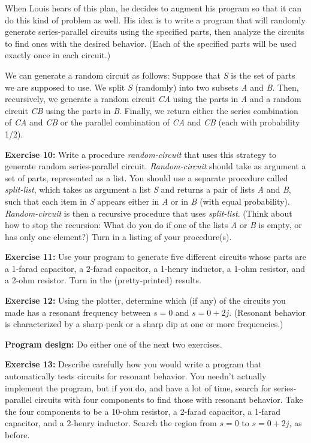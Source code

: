 When Louis hears of this plan, he decides to augment his program so
that it can do this kind of problem as well.  His idea is to write a
program that will randomly generate series-parallel circuits using the
specified parts, then analyze the circuits to find ones with the desired
behavior.  (Each of the specified parts will be used exactly once in
each circuit.)

We can generate a random circuit as follows: Suppose that {\it S} is the
set of parts we are supposed to use.  We split {\it S} (randomly) into
two subsets {\it A} and {\it B}.  Then, recursively, we generate a random
circuit {\it CA} using the parts in {\it A} and a random circuit {\it CB}
using the parts in {\it B}.  Finally, we return either the series
combination of {\it CA} and {\it CB} or the parallel combination of {\it CA}
and {\it CB} (each with probability 1/2).

{\bf Exercise 10:}
Write a procedure {\it random-circuit} that uses this strategy to
generate random series-parallel circuit.  {\it Random-circuit} should
take as argument a set of parts, represented as a list.  You should
use a separate procedure called {\it split-list}, which takes as
argument a list {\it S} and returns a pair of lists {\it A} and {\it B},
such that each item in {\it S} appears either in {\it A} or in {\it B} (with
equal probability).  {\it Random-circuit} is then a recursive procedure
that uses {\it split-list}.  (Think about how to stop the recursion:
What do you do if one of the lists {\it A} or {\it B} is empty, or has
only one element?)  Turn in a listing of your procedure(s).

{\bf Exercise 11:}
Use your program to generate five different circuits whose parts are a
1-farad capacitor, a 2-farad capacitor, a 1-henry inductor, a 1-ohm
resistor, and a 2-ohm resistor.  Turn in the (pretty-printed) results.


{\bf Exercise 12:}
Using the plotter, determine which (if any) of the circuits you made has a
resonant frequency between $s=0$ and $s=0+2j$.  (Resonant behavior
is characterized by a sharp peak or a sharp dip at one or more
frequencies.)

{\bf Program design:} Do either one of the next two exercises.

{\bf Exercise 13:}
Describe carefully how you would write a program that automatically
tests circuits for resonant behavior.  You needn't actually implement
the program, but if you do, and have a lot of time, search for
series-parallel circuits with four components to find those with
resonant behavior.  Take the four components to be a 10-ohm resistor,
a 2-farad capacitor, a 1-farad capacitor, and a 2-henry inductor.
Search the region from $s=0$ to $s=0+2j$, as before.

